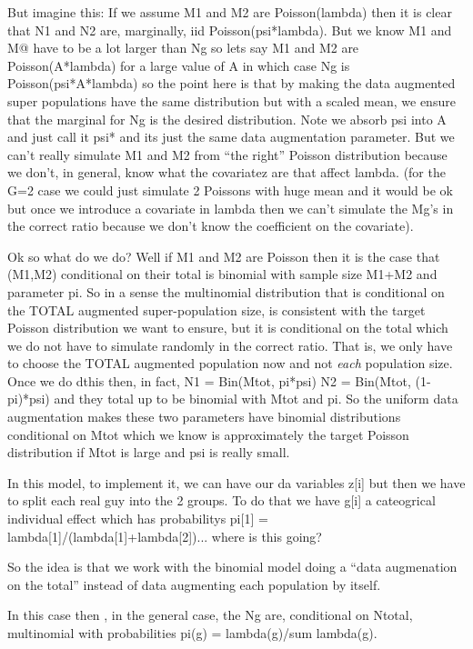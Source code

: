 But imagine this: If we assume M1 and M2 are Poisson(lambda) then it
is clear that N1 and N2 are, marginally, iid Poisson(psi*lambda).  But
we know M1 and M@ have to be a lot larger than Ng so lets say M1 and
M2 are Poisson(A*lambda) for a large value of A in which case Ng is
Poisson(psi*A*lambda) so the point here is that by making the data
augmented super populations have the same distribution but with a
scaled mean, we ensure that the marginal for Ng is the desired
distribution. Note we absorb psi into A and just call it psi* and its
just the same data augmentation parameter.  But we can't really
simulate M1 and M2 from ``the right'' Poisson distribution because we
don't, in general, know what the covariatez are that affect
lambda. (for the G=2 case we could just simulate 2 Poissons with huge
mean and it would be ok but once we introduce a covariate in lambda
then we can't simulate the Mg's in the correct ratio because we don't
know the coefficient on the covariate).

Ok so what do we do?
Well if M1 and M2 are Poisson then it is the case that (M1,M2)
conditional on their total is binomial with sample size M1+M2 and
parameter pi. So in a sense the multinomial distribution that is
conditional on the TOTAL augmented super-population size, is
consistent with the target Poisson distribution we want to ensure, but
it is conditional on the total which we do not have to simulate
randomly in the correct ratio.   That is, we only have to choose the
TOTAL augmented population now and not {\it each} population
size. Once we do dthis then, in fact,
N1 = Bin(Mtot, pi*psi)
N2 = Bin(Mtot, (1-pi)*psi)
and they total up to be binomial with Mtot and pi. So the uniform data
augmentation makes these two parameters have binomial distributions
conditional on Mtot which we know is approximately the target Poisson
distribution if Mtot is large and psi is really small. 

In this model, to implement it, we can have our da variables z[i] but
then we have to split each real guy into the 2 groups. To do that we
have g[i] a cateogrical individual effect which has probabilitys
pi[1] = lambda[1]/(lambda[1]+lambda[2])... where is this going?



So the idea is that we work with the binomial model doing a 
``data augmenation on the total'' instead of data augmenting each
population by itself. 

In this case then , in the general case, the Ng are, conditional on
Ntotal, multinomial with probabilities pi(g) = lambda(g)/sum lambda(g).



